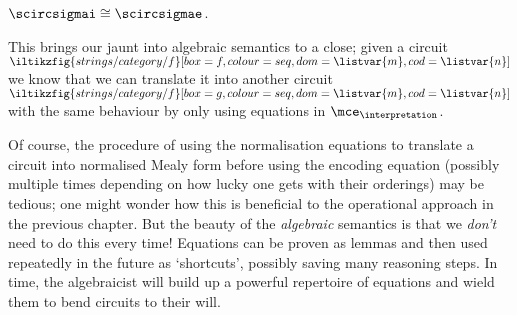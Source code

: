 \begin{corollary}
    \(\scircsigmai \cong \scircsigmae\).
\end{corollary}

This brings our jaunt into algebraic semantics to a close; given a circuit \(
\iltikzfig{strings/category/f}[box=f,colour=seq,dom=\listvar{m},cod=\listvar{n}]
\) we know that we can translate it into another circuit \(
\iltikzfig{strings/category/f}[box=g,colour=seq,dom=\listvar{m},cod=\listvar{n}]
\) with the same behaviour by only using equations in \(\mce_\interpretation\).

Of course, the procedure of using the normalisation equations to translate a
circuit into normalised Mealy form before using the encoding equation (possibly
multiple times depending on how lucky one gets with their orderings) may be
tedious; one might wonder how this is beneficial to the operational approach in
the previous chapter.
But the beauty of the \emph{algebraic} semantics is that we \emph{don't} need to
do this every time!
Equations can be proven as lemmas and then used repeatedly in the future as
`shortcuts', possibly saving many reasoning steps.
In time, the algebraicist will build up a powerful repertoire of equations and
wield them to bend circuits to their will.